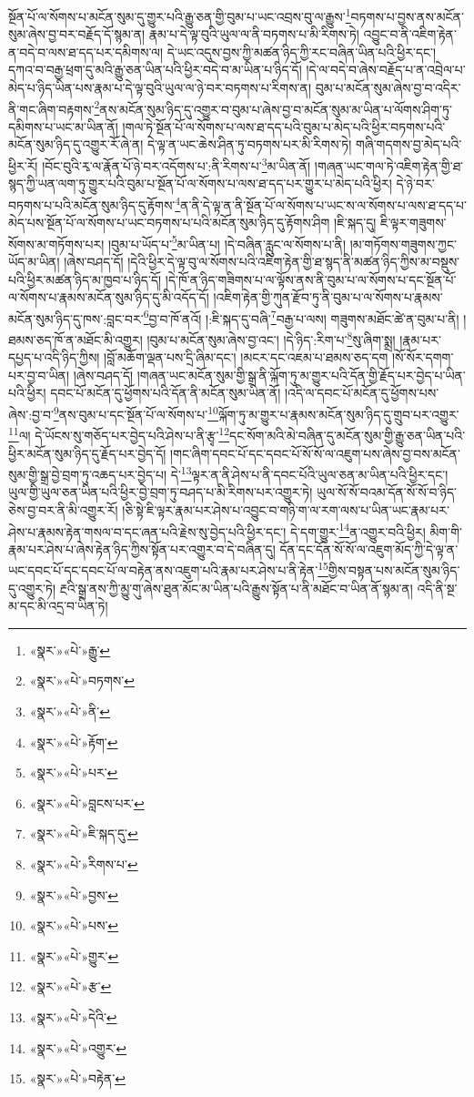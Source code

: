 སྔོན་པོ་ལ་སོགས་པ་མངོན་སུམ་དུ་གྱུར་པའི་རྒྱུ་ཅན་གྱི་བུམ་པ་ཡང་འབྲས་བུ་ལ་རྒྱུས་\footnote{«སྣར་»«པེ་»རྒྱུ་}བཏགས་པ་བྱས་ནས་མངོན་སུམ་ཞེས་བྱ་བར་བརྗོད་དོ་སྙམ་ན། རྣམ་པ་དེ་ལྟ་བུའི་ཡུལ་ལ་ནི་བཏགས་པ་མི་རིགས་ཏེ། འབྱུང་བ་ནི་འཇིག་རྟེན་ན་བདེ་བ་ལས་ཐ་དད་པར་དམིགས་ལ། དེ་ཡང་འདུས་བྱས་ཀྱི་མཚན་ཉིད་ཀྱི་རང་བཞིན་ཡིན་པའི་ཕྱིར་དང་། དཀའ་བ་བརྒྱ་ཕྲག་དུ་མའི་རྒྱུ་ཅན་ཡིན་པའི་ཕྱིར་བདེ་བ་མ་ཡིན་པ་ཉིད་དོ། །དེ་ལ་བདེ་བ་ཞེས་བརྗོད་པ་ན་འབྲེལ་པ་མེད་པ་ཉིད་ཡིན་པས་རྣམ་པ་དེ་ལྟ་བུའི་ཡུལ་ལ་ཉེ་བར་བཏགས་པ་རིགས་ན། བུམ་པ་མངོན་སུམ་ཞེས་བྱ་བ་འདིར་ནི་གང་ཞིག་བརྟགས་\footnote{«སྣར་»«པེ་»བཏགས་}ནས་མངོན་སུམ་ཉིད་དུ་འགྱུར་བ་བུམ་པ་ཞེས་བྱ་བ་མངོན་སུམ་མ་ཡིན་པ་ལོགས་ཤིག་ཏུ་དམིགས་པ་ཡང་མ་ཡིན་ནོ། །གལ་ཏེ་སྔོན་པོ་ལ་སོགས་པ་ལས་ཐ་དད་པའི་བུམ་པ་མེད་པའི་ཕྱིར་བཏགས་པའི་མངོན་སུམ་ཉིད་དུ་འགྱུར་རོ་ཞེ་ན། དེ་ལྟ་ན་ཡང་ཆེས་ཤིན་ཏུ་བཏགས་པར་མི་རིགས་ཏེ། གཞི་གདགས་བྱ་མེད་པའི་ཕྱིར་རོ། །བོང་བུའི་རྭ་ལ་རྣོན་པོ་ཉེ་བར་འདོགས་པ་:ནི་རིགས་པ་\footnote{«སྣར་»«པེ་»ནི་}མ་ཡིན་ནོ། །གཞན་ཡང་གལ་ཏེ་འཇིག་རྟེན་གྱི་ཐ་སྙད་ཀྱི་ཡན་ལག་ཏུ་གྱུར་པའི་བུམ་པ་སྔོན་པོ་ལ་སོགས་པ་ལས་ཐ་དད་པར་གྱུར་པ་མེད་པའི་ཕྱིར། དེ་ཉེ་བར་བཏགས་པ་པའི་མངོན་སུམ་ཉིད་དུ་རྟོགས་\footnote{«སྣར་»«པེ་»རྟོག་}ན་ནི་དེ་ལྟ་ན་ནི་སྔོན་པོ་ལ་སོགས་པ་ཡང་ས་ལ་སོགས་པ་ལས་ཐ་དད་པ་མེད་པས་སྔོན་པོ་ལ་སོགས་པ་ཡང་བཏགས་པ་པའི་མངོན་སུམ་ཉིད་དུ་རྟོགས་ཤིག །ཇི་སྐད་དུ། ཇི་ལྟར་གཟུགས་སོགས་མ་གཏོགས་པར། །བུམ་པ་ཡོད་པ་\footnote{«སྣར་»«པེ་»པར་}མ་ཡིན་པ། །དེ་བཞིན་རླུང་ལ་སོགས་པ་ནི། །མ་གཏོགས་གཟུགས་ཀྱང་ཡོད་མ་ཡིན། །ཞེས་བཤད་དོ། །དེའི་ཕྱིར་དེ་ལྟ་བུ་ལ་སོགས་པའི་འཇིག་རྟེན་གྱི་ཐ་སྙད་ནི་མཚན་ཉིད་ཀྱིས་མ་བསྡུས་པའི་ཕྱིར་མཚན་ཉིད་མ་ཁྱབ་པ་ཉིད་དོ། །དེ་ཁོ་ན་ཉིད་གཟིགས་པ་ལ་ལྟོས་ནས་ནི་བུམ་པ་ལ་སོགས་པ་དང་སྔོན་པོ་ལ་སོགས་པ་རྣམས་མངོན་སུམ་ཉིད་དུ་མི་འདོད་དོ། །འཇིག་རྟེན་གྱི་ཀུན་རྫོབ་ཏུ་ནི་བུམ་པ་ལ་སོགས་པ་རྣམས་མངོན་སུམ་ཉིད་དུ་ཁས་:བླང་བར་\footnote{«སྣར་»«པེ་»བླངས་པར་}བྱ་བ་ཁོ་ནའོ། །:ཇི་སྐད་དུ་བཞི་\footnote{«སྣར་»«པེ་»ཇི་སྐད་དུ་}བརྒྱ་པ་ལས། གཟུགས་མཐོང་ཚེ་ན་བུམ་པ་ནི། །ཐམས་ཅད་ཁོ་ན་མཐོང་མི་འགྱུར། །བུམ་པ་མངོན་སུམ་ཞེས་བྱ་འང་། །དེ་ཉིད་:རིག་པ་\footnote{«སྣར་»«པེ་»རིགས་པ་}སུ་ཞིག་སྨྲ། །རྣམ་པར་དཔྱད་པ་འདི་ཉིད་ཀྱིས། །བློ་མཆོག་ལྡན་པས་དྲི་ཞིམ་དང་། །མངར་དང་འཇམ་པ་ཐམས་ཅད་དག །སོ་སོར་དགག་པར་བྱ་བ་ཡིན། །ཞེས་བཤད་དོ། །གཞན་ཡང་མངོན་སུམ་གྱི་སྒྲ་ནི་ལྐོག་ཏུ་མ་གྱུར་པའི་དོན་གྱི་རྗོད་པར་བྱེད་པ་ཡིན་པའི་ཕྱིར། དབང་པོ་མངོན་དུ་ཕྱོགས་པའི་དོན་ནི་མངོན་སུམ་ཡིན་ནོ། །འདི་ལ་དབང་པོ་མངོན་དུ་ཕྱོགས་པས་ཞེས་:བྱ་བ་\footnote{«སྣར་»«པེ་»བྱས་}ནས་བུམ་པ་དང་སྔོན་པོ་ལ་སོགས་པ་\footnote{«སྣར་»«པེ་»པས་}ལྐོག་ཏུ་མ་གྱུར་པ་རྣམས་མངོན་སུམ་ཉིད་དུ་གྲུབ་པར་འགྱུར་\footnote{«སྣར་»«པེ་»གྱུར་}ལ། དེ་ཡོངས་སུ་གཅོད་པར་བྱེད་པའི་ཤེས་པ་ནི་རྩྭ་\footnote{«སྣར་»«པེ་»རྩ་}དང་སོག་མའི་མེ་བཞིན་དུ་མངོན་སུམ་གྱི་རྒྱུ་ཅན་ཡིན་པའི་ཕྱིར་མངོན་སུམ་ཉིད་དུ་རྗོད་པར་བྱེད་དོ། །གང་ཞིག་དབང་པོ་དང་དབང་པོ་སོ་སོ་ལ་འཇུག་པས་ཞེས་བྱ་བས་མངོན་སུམ་གྱི་སྒྲ་བྱེ་བྲག་ཏུ་འཆད་པར་བྱེད་པ། དེ་\footnote{«སྣར་»«པེ་»དེའི་}ལྟར་ན་ནི་ཤེས་པ་ནི་དབང་པོའི་ཡུལ་ཅན་མ་ཡིན་པའི་ཕྱིར་དང་། ཡུལ་གྱི་ཡུལ་ཅན་ཡིན་པའི་ཕྱིར་བྱེ་བྲག་ཏུ་བཤད་པ་མི་རིགས་པར་འགྱུར་ཏེ། ཡུལ་སོ་སོ་བའམ་དོན་སོ་སོ་བ་ཉིད་ཅེས་བྱ་བར་ནི་མི་འགྱུར་རོ། །ཅི་སྟེ་ཇི་ལྟར་རྣམ་པར་ཤེས་པ་འབྱུང་བ་གཉི་ག་ལ་རག་ལས་པ་ཡིན་ཡང་རྣམ་པར་ཤེས་པ་རྣམས་རྟེན་གསལ་བ་དང་ཞན་པའི་རྗེས་སུ་བྱེད་པའི་ཕྱིར་དང་། དེ་དག་གྱུར་\footnote{«སྣར་»«པེ་»འགྱུར་}ན་འགྱུར་བའི་ཕྱིར། མིག་གི་རྣམ་པར་ཤེས་པ་ཞེས་རྟེན་ཉིད་ཀྱིས་སྟོན་པར་འགྱུར་བ་དེ་བཞིན་དུ། དོན་དང་དོན་སོ་སོ་ལ་འཇུག་མོད་ཀྱི་དེ་ལྟ་ན་ཡང་དབང་པོ་དང་དབང་པོ་ལ་བརྟེན་ནས་འཇུག་པའི་རྣམ་པར་ཤེས་པ་ནི་རྟེན་\footnote{«སྣར་»«པེ་»བརྟེན་}གྱིས་བསྟན་པས་མངོན་སུམ་ཉིད་དུ་འགྱུར་ཏེ། རྔའི་སྒྲ་ནས་ཀྱི་མྱུ་གུ་ཞེས་ཐུན་མོང་མ་ཡིན་པའི་རྒྱུས་སྟོན་པ་ནི་མཐོང་བ་ཡིན་ནོ་སྙམ་ན། འདི་ནི་སྔ་མ་དང་མི་འདྲ་བ་ཡིན་ཏེ། 